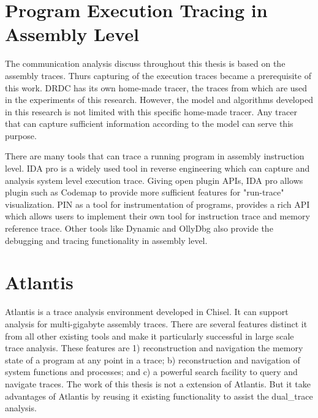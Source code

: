 \section{Program Execution Tracing in Assembly Level}
The communication analysis discuss throughout this thesis is based on the assembly traces. Thurs capturing of the execution traces became a prerequisite of this work. DRDC has its own home-made tracer, the traces from which are used in the experiments of this research. However, the model and algorithms developed in this research is not limited with this specific home-made tracer. Any tracer that can capture sufficient information according to the model can serve this purpose.

There are many tools that can trace a running program in assembly instruction level.  IDA pro \cite{eagle_ida_2008} is a widely used tool in reverse engineering which can capture and analysis system level execution trace. Giving open plugin APIs, IDA pro allows plugin such as Codemap \cite{_c0demap/codemap:_????} to provide more sufficient features for "run-trace" visualization. PIN\cite{_pin_????} as a tool for instrumentation of programs, provides a rich API which allows users to implement their own tool for instruction trace and memory reference trace. Other tools like Dynamic \cite{brueningqz} and OllyDbg\cite{yuschuk2007ollydbg} also provide the debugging and tracing functionality in assembly level. 

\section{Atlantis}
Atlantis is a trace analysis environment developed in Chisel. It can support analysis for multi-gigabyte assembly traces. There are several features distinct it from all other existing tools and make it particularly successful in large scale trace analysis. These features are 1) reconstruction and navigation the memory state of a program at any point in a trace; b) reconstruction and navigation of system functions and processes; and c) a powerful search facility to query and navigate traces. The work of this thesis is not a extension of Atlantis. But it take advantages of Atlantis by reusing it existing functionality to assist the dual\_trace analysis.




